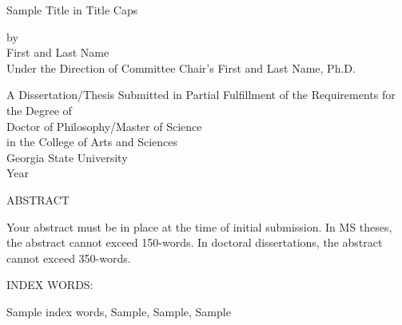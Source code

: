\pagestyle{empty}
\begin{center}
Sample Title in Title Caps

\vspace{.9in}
by\\
\vspace{.9in}
First and Last Name\\
\vspace{.9in}
Under the Direction of Committee Chair's First and Last Name, Ph.D. \\
\vspace{2in}

A Dissertation/Thesis Submitted in Partial Fulfillment of the Requirements for the Degree of\\  %
\vspace{.2in}
Doctor of Philosophy/Master of Science \\
\vspace{.2in}
in the College of Arts and Sciences \\
\vspace{.2in}
Georgia State University \\
\vspace{.2in}
Year
\pagebreak 



ABSTRACT\\
\bigskip
\end{center}


Your abstract must be in place at the time of initial submission. In MS theses, the abstract cannot exceed 150-words. In doctoral dissertations, the abstract cannot exceed 350-words. 


\begin{singlespace}
\vspace{0.5in}
\noindent INDEX WORDS:
\hspace{0.2in}
\parbox[t]{4.5in}{
Sample index words, Sample, Sample, Sample}
\end{singlespace} 
